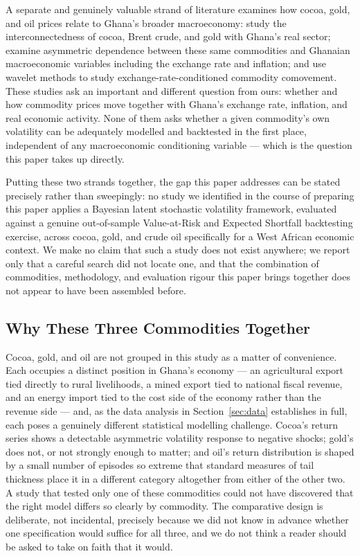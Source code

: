 \documentclass[preprint,12pt,authoryear]{elsarticle}
\begin{document}
A separate and genuinely valuable strand of literature examines how cocoa, gold, and oil prices relate to Ghana's broader macroeconomy: \citet{boateng2022} study the interconnectedness of cocoa, Brent crude, and gold with Ghana's real sector; \citet{yeboah2025} examine asymmetric dependence between these same commodities and Ghanaian macroeconomic variables including the exchange rate and inflation; and \citet{barson2023} use wavelet methods to study exchange-rate-conditioned commodity comovement. These studies ask an important and different question from ours: whether and how commodity prices move together with Ghana's exchange rate, inflation, and real economic activity. None of them asks whether a given commodity's own volatility can be adequately modelled and backtested in the first place, independent of any macroeconomic conditioning variable --- which is the question this paper takes up directly.

Putting these two strands together, the gap this paper addresses can be stated precisely rather than sweepingly: no study we identified in the course of preparing this paper applies a Bayesian latent stochastic volatility framework, evaluated against a genuine out-of-sample Value-at-Risk and Expected Shortfall backtesting exercise, across cocoa, gold, and crude oil specifically for a West African economic context. We make no claim that such a study does not exist anywhere; we report only that a careful search did not locate one, and that the combination of commodities, methodology, and evaluation rigour this paper brings together does not appear to have been assembled before.

\subsection{Why These Three Commodities Together}

Cocoa, gold, and oil are not grouped in this study as a matter of convenience. Each occupies a distinct position in Ghana's economy --- an agricultural export tied directly to rural livelihoods, a mined export tied to national fiscal revenue, and an energy import tied to the cost side of the economy rather than the revenue side --- and, as the data analysis in Section~\ref{sec:data} establishes in full, each poses a genuinely different statistical modelling challenge. Cocoa's return series shows a detectable asymmetric volatility response to negative shocks; gold's does not, or not strongly enough to matter; and oil's return distribution is shaped by a small number of episodes so extreme that standard measures of tail thickness place it in a different category altogether from either of the other two. A study that tested only one of these commodities could not have discovered that the right model differs so clearly by commodity. The comparative design is deliberate, not incidental, precisely because we did not know in advance whether one specification would suffice for all three, and we do not think a reader should be asked to take on faith that it would.
\end{document}
